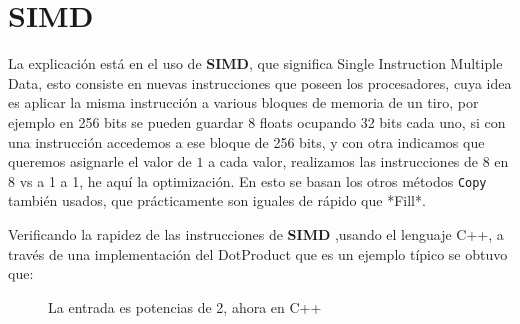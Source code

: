 \documentclass[14pt]{extarticle}
\begin{document}
\section{SIMD}
La explicación está en el uso de \textbf{SIMD}, que significa Single Instruction Multiple Data, esto consiste en nuevas instrucciones que poseen los procesadores, cuya idea es aplicar la misma instrucción a various bloques de memoria de un tiro, por ejemplo en 256 bits se pueden guardar 8 floats ocupando 32 bits cada uno, si con una instrucción accedemos a ese bloque de 256 bits, y con otra indicamos que queremos asignarle el valor de $1$ a cada valor, realizamos las instrucciones de 8 en 8 vs a 1 a 1, he aquí la optimización. En esto se basan los otros métodos \texttt{Copy} también usados, que prácticamente son iguales de rápido que *Fill*. 

Verificando la rapidez de las instrucciones de \textbf{SIMD} ,usando el lenguaje C++,  a través de una implementación del DotProduct que es un ejemplo típico se obtuvo que:

\begin{figure}[htbp]
    
    \caption{La entrada es potencias de 2, ahora en C++}
\end{figure}
\end{document}
